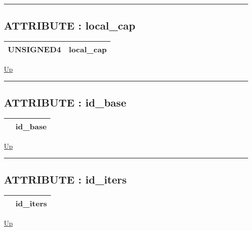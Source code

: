 \par


\rule{\textwidth}{0.4pt}
\subsection*{ATTRIBUTE : local\_cap}
\hypertarget{ecldoc:logisticregression.constants.local_cap}{}

{\renewcommand{\arraystretch}{1.5}
\begin{tabularx}{\textwidth}{|>{\raggedright\arraybackslash}l|X|}
\hline
\hspace{0pt}UNSIGNED4 & local\_cap \\
\hline
\end{tabularx}
}

\hyperlink{ecldoc:LogisticRegression.Constants}{Up}

\par


\rule{\textwidth}{0.4pt}
\subsection*{ATTRIBUTE : id\_base}
\hypertarget{ecldoc:logisticregression.constants.id_base}{}

{\renewcommand{\arraystretch}{1.5}
\begin{tabularx}{\textwidth}{|>{\raggedright\arraybackslash}l|X|}
\hline
\hspace{0pt} & id\_base \\
\hline
\end{tabularx}
}

\hyperlink{ecldoc:LogisticRegression.Constants}{Up}

\par


\rule{\textwidth}{0.4pt}
\subsection*{ATTRIBUTE : id\_iters}
\hypertarget{ecldoc:logisticregression.constants.id_iters}{}

{\renewcommand{\arraystretch}{1.5}
\begin{tabularx}{\textwidth}{|>{\raggedright\arraybackslash}l|X|}
\hline
\hspace{0pt} & id\_iters \\
\hline
\end{tabularx}
}

\hyperlink{ecldoc:LogisticRegression.Constants}{Up}

